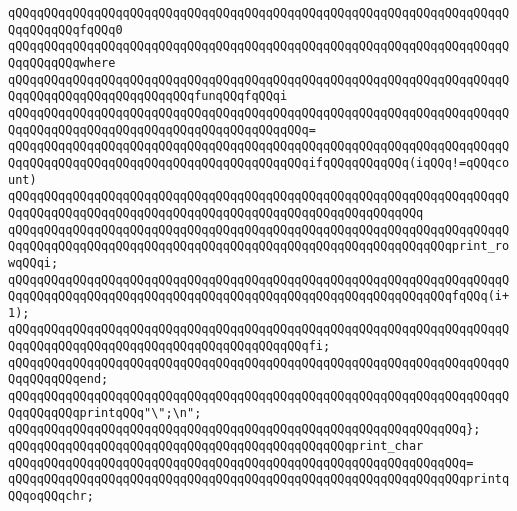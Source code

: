 \newline
\verb|qQQqqQQqqQQqqQQqqQQqqQQqqQQqqQQqqQQqqQQqqQQqqQQqqQQqqQQqqQQqqQQqqQQqqQQqqQQqqQQqfqQQq0|\newline
\verb|qQQqqQQqqQQqqQQqqQQqqQQqqQQqqQQqqQQqqQQqqQQqqQQqqQQqqQQqqQQqqQQqqQQqqQQqqQQqqQQqwhere|\newline
\verb|qQQqqQQqqQQqqQQqqQQqqQQqqQQqqQQqqQQqqQQqqQQqqQQqqQQqqQQqqQQqqQQqqQQqqQQqqQQqqQQqqQQqqQQqqQQqqQQqfunqQQqfqQQqi|\newline
\verb|qQQqqQQqqQQqqQQqqQQqqQQqqQQqqQQqqQQqqQQqqQQqqQQqqQQqqQQqqQQqqQQqqQQqqQQqqQQqqQQqqQQqqQQqqQQqqQQqqQQqqQQqqQQqqQQq=|\newline
\verb|qQQqqQQqqQQqqQQqqQQqqQQqqQQqqQQqqQQqqQQqqQQqqQQqqQQqqQQqqQQqqQQqqQQqqQQqqQQqqQQqqQQqqQQqqQQqqQQqqQQqqQQqqQQqqQQqifqQQqqQQqqQQq(iqQQq!=qQQqcount)|\newline
\verb|qQQqqQQqqQQqqQQqqQQqqQQqqQQqqQQqqQQqqQQqqQQqqQQqqQQqqQQqqQQqqQQqqQQqqQQqqQQqqQQqqQQqqQQqqQQqqQQqqQQqqQQqqQQqqQQqqQQqqQQqqQQqqQQq|\newline
\verb|qQQqqQQqqQQqqQQqqQQqqQQqqQQqqQQqqQQqqQQqqQQqqQQqqQQqqQQqqQQqqQQqqQQqqQQqqQQqqQQqqQQqqQQqqQQqqQQqqQQqqQQqqQQqqQQqqQQqqQQqqQQqqQQqqQQqprint_rowqQQqi;|\newline
\verb|qQQqqQQqqQQqqQQqqQQqqQQqqQQqqQQqqQQqqQQqqQQqqQQqqQQqqQQqqQQqqQQqqQQqqQQqqQQqqQQqqQQqqQQqqQQqqQQqqQQqqQQqqQQqqQQqqQQqqQQqqQQqqQQqqQQqfqQQq(i+1);|\newline
\verb|qQQqqQQqqQQqqQQqqQQqqQQqqQQqqQQqqQQqqQQqqQQqqQQqqQQqqQQqqQQqqQQqqQQqqQQqqQQqqQQqqQQqqQQqqQQqqQQqqQQqqQQqqQQqqQQqfi;|\newline
\verb|qQQqqQQqqQQqqQQqqQQqqQQqqQQqqQQqqQQqqQQqqQQqqQQqqQQqqQQqqQQqqQQqqQQqqQQqqQQqqQQqend;|\newline
\newline
\verb|qQQqqQQqqQQqqQQqqQQqqQQqqQQqqQQqqQQqqQQqqQQqqQQqqQQqqQQqqQQqqQQqqQQqqQQqqQQqqQQqprintqQQq"\";\n";|\newline
\verb|qQQqqQQqqQQqqQQqqQQqqQQqqQQqqQQqqQQqqQQqqQQqqQQqqQQqqQQqqQQqqQQq};|\newline
\newline
\verb|qQQqqQQqqQQqqQQqqQQqqQQqqQQqqQQqqQQqqQQqqQQqqQQqprint_char|\newline
\verb|qQQqqQQqqQQqqQQqqQQqqQQqqQQqqQQqqQQqqQQqqQQqqQQqqQQqqQQqqQQqqQQq=|\newline
\verb|qQQqqQQqqQQqqQQqqQQqqQQqqQQqqQQqqQQqqQQqqQQqqQQqqQQqqQQqqQQqqQQqprintqQQqoqQQqchr;|\newline
\newline
\newline
